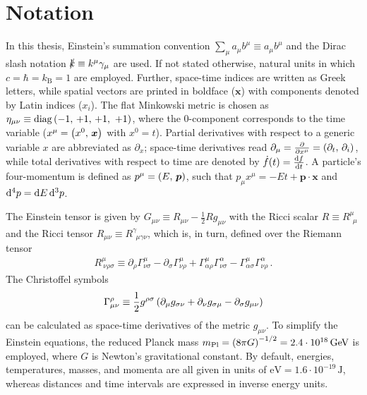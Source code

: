 	\vfill
	\chapter*{Notation}
	In this thesis, Einstein's summation convention $\sum_\mu a_\mu b^\mu \equiv a_\mu b^\mu$ and the Dirac slash notation $\slashed{k} \equiv k^\mu \gamma_\mu$ are used. If not stated otherwise, natural units in which $c = \hbar = k_\mathrm{B} = 1$ are employed. Further, space-time indices are written as Greek letters, while spatial vectors are printed in boldface ($\bm{x}$) with components denoted by Latin indices ($x_i$). The flat Minkowski metric is chosen as $\eta_{\mu \nu} \equiv \mathrm{diag} \left( -1,\, +1,\, +1,\ +1 \right)$, where the $0$-component corresponds to the time variable (\ie $x^\mu = \left( x^0, \, \bm{x} \right)$ with $x^0 = t$). Partial derivatives with respect to a generic variable $x$ are abbreviated as $\partial_x$; space-time derivatives read $\partial_\mu = \frac{\partial }{\partial x^\mu} = \left( \partial_t, \, \partial_i \right)$, while total derivatives with respect to time are denoted by $\dot{f}(t)=\frac{\mathrm d f}{\mathrm d t}$. A particle's four-momentum is defined as $p^\mu = \left( E, \, \bm{p} \right)$, such that $p_\mu x^\mu = -Et + \bm{p} \cdot \bm{x}$ and $\mathop{}\!\mathrm{d^4}p = \mathop{}\!\mathrm{d} E \mathop{}\!\mathrm{d^3}p$.
	
	The Einstein tensor is given by $G_{\mu \nu} \equiv R_{\mu \nu} - \frac{1}{2} R g_{\mu \nu}$ with the Ricci scalar $R \equiv R^{\mu}_{\ ~ \mu}$ and the Ricci tensor $R_{\mu \nu} \equiv R^{\gamma}_{\ ~ \mu \gamma \nu}$, which is, in turn, defined over the Riemann tensor
	\begin{align*}
	R^{\mu}_{~\nu \rho \sigma} \equiv \partial_\rho \Gamma^{\mu}_{\nu \sigma} - \partial_\sigma \Gamma^{\mu}_{\nu \rho} + \Gamma^{\mu}_{\alpha \rho} \Gamma^{\alpha}_{\nu \sigma} - \Gamma^{\mu}_{\alpha \sigma} \Gamma^{\alpha}_{\nu \rho} \, .
	\end{align*}
	The Christoffel symbols
	\begin{align*}
	\Gamma^{\rho}_{{\mu \nu}} \equiv \frac{1}{2} g^{\rho \sigma} \left( \partial_\mu g_{\sigma \nu} + \partial_\nu g_{\sigma \mu} - \partial_\sigma g_{{\mu \nu}} \right)
	\end{align*}
	can be calculated as space-time derivatives of the metric $g_{\mu \nu}$. To simplify the Einstein equations, the reduced Planck mass $m_\text{Pl} = \left( 8 \pi G \right)^{-1/2} = 2.4 \cdot 10^{18} \, \text{GeV}$ is employed, where $G$ %
	is Newton's gravitational constant. By default, energies, temperatures, masses, and momenta are all given in units of $\text{eV} = 1.6 \cdot 10^{-19}\, \text{J}$, whereas distances and time intervals are expressed in inverse energy units.
\endgroup
